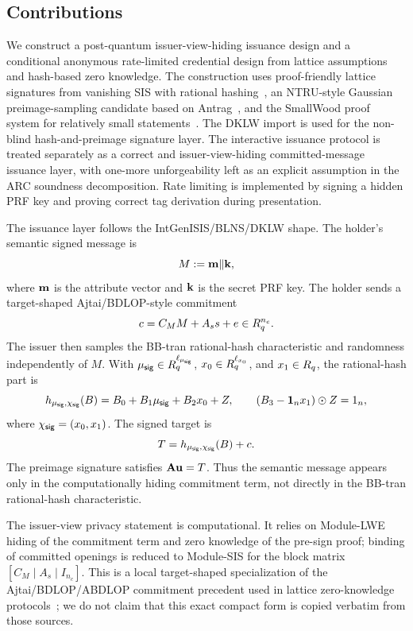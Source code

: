 \subsection{Contributions}
We construct a post-quantum issuer-view-hiding issuance design and a conditional anonymous rate-limited
credential design from lattice assumptions and hash-based zero knowledge.  The construction uses proof-friendly
lattice signatures from vanishing SIS with rational hashing~\cite{EPRINT:DKLW25}, an NTRU-style Gaussian
preimage-sampling candidate based on Antrag~\cite{EPRINT:ENSTW23}, and the SmallWood proof system for
relatively small statements~\cite{EPRINT:FenRiv25b}.  The DKLW import is used for the non-blind
hash-and-preimage signature layer.  The interactive issuance protocol is treated separately as a correct and
issuer-view-hiding committed-message issuance layer, with one-more unforgeability left as an explicit assumption
in the ARC soundness decomposition.  Rate limiting is implemented by signing a hidden PRF key and proving correct
tag derivation during presentation.

The issuance layer follows the IntGenISIS/BLNS/DKLW shape.  The holder's semantic signed message is
\[
  M := \mathbf{m}\Vert\mathbf{k},
\]
where \(\mathbf{m}\) is the attribute vector and \(\mathbf{k}\) is the secret PRF key.  The holder sends a target-shaped
Ajtai/BDLOP-style commitment
\[
  c=C_M M+A_s s+e\in R_q^{n_c}.
\]
The issuer then samples the BB-tran rational-hash characteristic and randomness independently of \(M\).  With
\(\mu_{\mathsf{sig}}\in R_q^{\ell_{\mu_{\mathsf{sig}}}}\), \(x_0\in R_q^{\ell_{x_0}}\), and \(x_1\in R_q\), the rational-hash part is
\[
  h_{\mu_{\mathsf{sig}},\chi_{\mathsf{sig}}}(B)=B_0+B_1\mu_{\mathsf{sig}}+B_2x_0+Z,
  \qquad
  (B_3-\mathbf 1_n x_1)\odot Z=1_n,
\]
where \(\chi_{\mathsf{sig}}=(x_0,x_1)\).  The signed target is
\[
  T=h_{\mu_{\mathsf{sig}},\chi_{\mathsf{sig}}}(B)+c.
\]
The preimage signature satisfies \(\mathbf{A}\mathbf{u}=T\).  Thus the semantic message appears only in the computationally
hiding commitment term, not directly in the BB-tran rational-hash characteristic.

The issuer-view privacy statement is computational.  It relies on Module-LWE hiding of the commitment term and
zero knowledge of the pre-sign proof; binding of committed openings is reduced to Module-SIS for the block matrix
\([C_M\mid A_s\mid I_{n_c}]\).  This is a local target-shaped specialization of the Ajtai/BDLOP/ABDLOP commitment
precedent used in lattice zero-knowledge protocols~\cite{BDLOP18,LNP22}; we do not claim that this exact compact
form is copied verbatim from those sources.

